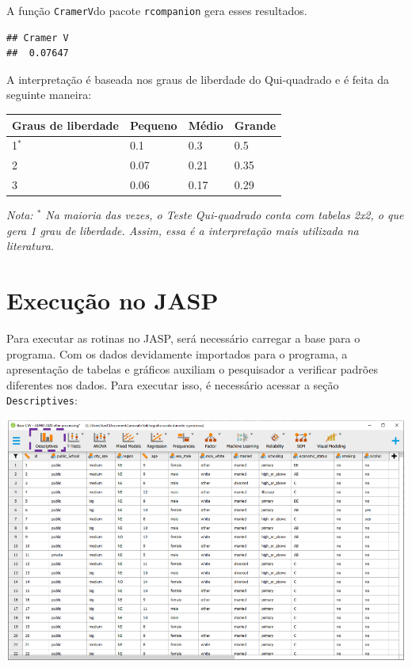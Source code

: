 \documentclass[
]{book}
\newenvironment{Shaded}{\begin{snugshade}}{\end{snugshade}}
\newcommand{\KeywordTok}[1]{\textcolor[rgb]{0.13,0.29,0.53}{\textbf{#1}}}
\newcommand{\NormalTok}[1]{#1}
\newcommand{\OperatorTok}[1]{\textcolor[rgb]{0.81,0.36,0.00}{\textbf{#1}}}
\begin{document}
A função \texttt{CramerV}do pacote \texttt{rcompanion} gera esses resultados.

\begin{Shaded}
\end{Shaded}

\begin{verbatim}
## Cramer V 
##  0.07647
\end{verbatim}

A interpretação é baseada nos graus de liberdade do Qui-quadrado e é feita da seguinte maneira:

\begin{longtable}[]{@{}llll@{}}
\toprule
Graus de liberdade & Pequeno & Médio & Grande\tabularnewline
\midrule
\endhead
1\(^*\) & 0.1 & 0.3 & 0.5\tabularnewline
2 & 0.07 & 0.21 & 0.35\tabularnewline
3 & 0.06 & 0.17 & 0.29\tabularnewline
\bottomrule
\end{longtable}

\emph{Nota: \(^*\) Na maioria das vezes, o Teste Qui-quadrado conta com tabelas 2x2, o que gera 1 grau de liberdade. Assim, essa é a interpretação mais utilizada na literatura.}

\hypertarget{execuuxe7uxe3o-no-jasp-1}{%
\section{Execução no JASP}\label{execuuxe7uxe3o-no-jasp-1}}

Para executar as rotinas no JASP, será necessário carregar a base para o programa. Com os dados devidamente importados para o programa, a apresentação de tabelas e gráficos auxiliam o pesquisador a verificar padrões diferentes nos dados. Para executar isso, é necessário acessar a seção \texttt{Descriptives}:

\includegraphics{./img/cap_x2_tela_inicial.png}
\end{document}
